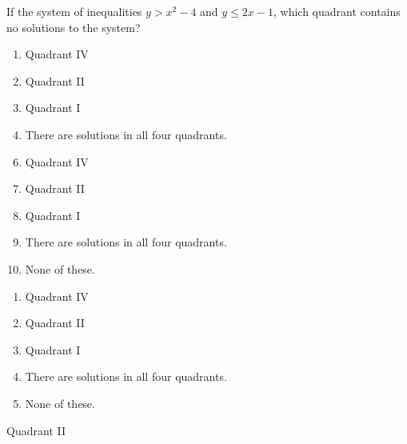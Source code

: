  
\vspace{-6mm}\begin{center}
\end{center}
If the system of inequalities $y>x^2-4$ and $y \leq 2x-1$, which quadrant contains no solutions to the system?


\ifsat
	\begin{enumerate}[label=\Alph*)]
		\item Quadrant IV
		\item Quadrant II %
		\item Quadrant I
		\item There are solutions in all four quadrants.
	\end{enumerate}
\else
\fi

\ifacteven
	\begin{enumerate}[label=\textbf{\Alph*.},itemsep=\fill,align=left]
		\setcounter{enumii}{5}
		\item Quadrant IV
		\item Quadrant II %
		\item Quadrant I
		\addtocounter{enumii}{1}
		\item There are solutions in all four quadrants.
		\item None of these. 
	\end{enumerate}
\else
\fi

\ifactodd
	\begin{enumerate}[label=\textbf{\Alph*.},itemsep=\fill,align=left]
		\item Quadrant IV
		\item Quadrant II %
		\item Quadrant I
		\item There are solutions in all four quadrants.
		\item None of these. 
	\end{enumerate}
\else
\fi

\ifgridin
 Quadrant II %
		
\else
\fi

